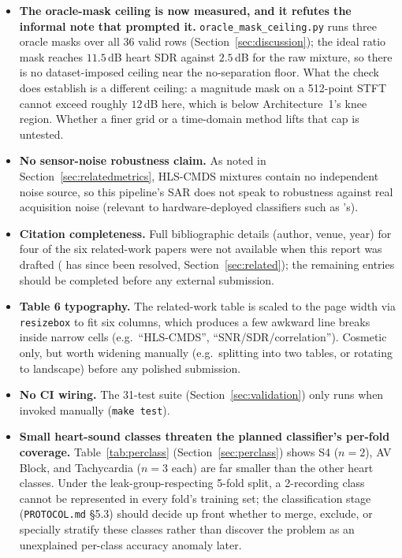 \documentclass[11pt]{article}
\begin{document}
\begin{itemize}
    moved Baseline~2's full-set SDR by more than the fold-to-fold spread, so
    the method's shortfall against Baseline~1 was not caused by either.
    The paper's own training-dataset description remains ambiguous between
    ICBHI\,2017+Fraiwan and HLS-CMDS's isolated recordings
    (Table~\ref{tab:related}); this project fits on HLS-CMDS's isolated
    recordings under the leakage-safe pool and says so.
  \item \textbf{The oracle-mask ceiling is now measured, and it refutes
    the informal note that prompted it.} \texttt{oracle\_mask\_ceiling.py}
    runs three oracle masks over all 36 valid rows (Section~\ref{sec:discussion});
    the ideal ratio mask reaches $11.5$\,dB heart SDR against $2.5$\,dB for
    the raw mixture, so there is no dataset-imposed ceiling near the
    no-separation floor. What the check does establish is a different
    ceiling: a magnitude mask on a 512-point STFT cannot exceed roughly
    $12$\,dB here, which is below Architecture~1's knee region. Whether a
    finer grid or a time-domain method lifts that cap is untested.
  \item \textbf{No sensor-noise robustness claim.} As noted in
    Section~\ref{sec:relatedmetrics}, HLS-CMDS mixtures contain no
    independent noise source, so this pipeline's SAR does not speak to
    robustness against real acquisition noise (relevant to
    hardware-deployed classifiers such as \cite{edgelung}'s).
  \item \textbf{Citation completeness.} Full bibliographic details (author,
    venue, year) for four of the six related-work papers were not available
    when this report was drafted (\cite{nmfcrnn} has since been resolved,
    Section~\ref{sec:related}); the remaining entries should be completed
    before any external submission.
  \item \textbf{Table 6 typography.} The related-work table is scaled to
    the page width via \texttt{resizebox} to fit six columns, which produces
    a few awkward line breaks inside narrow cells (e.g.\ ``HLS-CMDS'',
    ``SNR/SDR/correlation''). Cosmetic only, but worth widening manually
    (e.g.\ splitting into two tables, or rotating to landscape) before any
    polished submission.
  \item \textbf{No CI wiring.} The 31-test suite (Section~\ref{sec:validation})
    only runs when invoked manually (\texttt{make test}).
  \item \textbf{Small heart-sound classes threaten the planned classifier's
    per-fold coverage.} Table~\ref{tab:perclass}
    (Section~\ref{sec:perclass}) shows S4 ($n{=}2$), AV Block, and
    Tachycardia ($n{=}3$ each) are far smaller than the other heart classes.
    Under the leak-group-respecting 5-fold split, a 2-recording class cannot
    be represented in every fold's training set; the classification stage
    (\texttt{PROTOCOL.md} \S5.3) should decide up front whether to merge,
    exclude, or specially stratify these classes rather than discover the
    problem as an unexplained per-class accuracy anomaly later.
\end{itemize}
\end{document}
